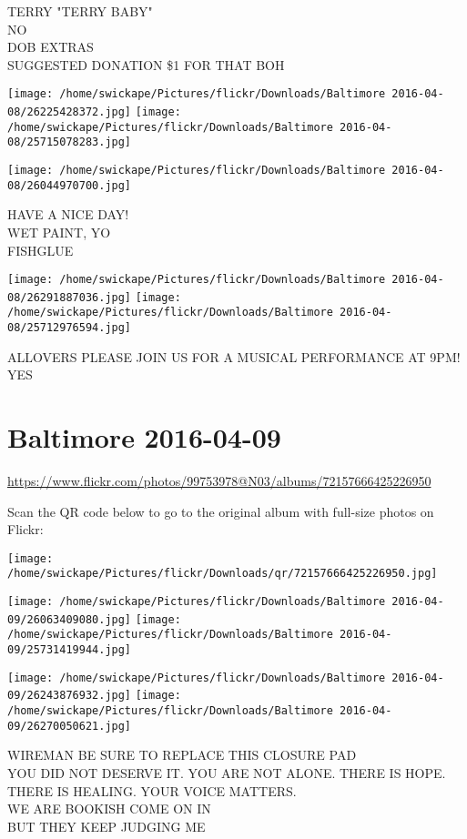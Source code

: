 \documentclass[10pt,letterpaper]{article}
\begin{document}
TERRY "TERRY BABY"\\
NO\\
DOB EXTRAS\\
SUGGESTED DONATION \$1 FOR THAT BOH
\pagebreak

\texttt{[image: /home/swickape/Pictures/flickr/Downloads/Baltimore 2016-04-08/26225428372.jpg]}
\texttt{[image: /home/swickape/Pictures/flickr/Downloads/Baltimore 2016-04-08/25715078283.jpg]}

\vspace{0.25in}
\texttt{[image: /home/swickape/Pictures/flickr/Downloads/Baltimore 2016-04-08/26044970700.jpg]}

HAVE A NICE DAY!\\
WET PAINT, YO\\
FISHGLUE
\pagebreak

\texttt{[image: /home/swickape/Pictures/flickr/Downloads/Baltimore 2016-04-08/26291887036.jpg]}
\texttt{[image: /home/swickape/Pictures/flickr/Downloads/Baltimore 2016-04-08/25712976594.jpg]}

ALLOVERS PLEASE JOIN US FOR A MUSICAL PERFORMANCE AT 9PM!\\
YES
\pagebreak

\section*{Baltimore 2016-04-09}

\url{https://www.flickr.com/photos/99753978@N03/albums/72157666425226950}

Scan the QR code below to go to the original album with full-size photos on Flickr:

\texttt{[image: /home/swickape/Pictures/flickr/Downloads/qr/72157666425226950.jpg]}
\pagebreak

\texttt{[image: /home/swickape/Pictures/flickr/Downloads/Baltimore 2016-04-09/26063409080.jpg]}
\texttt{[image: /home/swickape/Pictures/flickr/Downloads/Baltimore 2016-04-09/25731419944.jpg]}

\texttt{[image: /home/swickape/Pictures/flickr/Downloads/Baltimore 2016-04-09/26243876932.jpg]}
\texttt{[image: /home/swickape/Pictures/flickr/Downloads/Baltimore 2016-04-09/26270050621.jpg]}

WIREMAN BE SURE TO REPLACE THIS CLOSURE PAD\\
YOU DID NOT DESERVE IT. YOU ARE NOT ALONE. THERE IS HOPE. THERE IS HEALING. YOUR VOICE MATTERS.\\
WE ARE BOOKISH COME ON IN\\
BUT THEY KEEP JUDGING ME
\pagebreak
\end{document}
